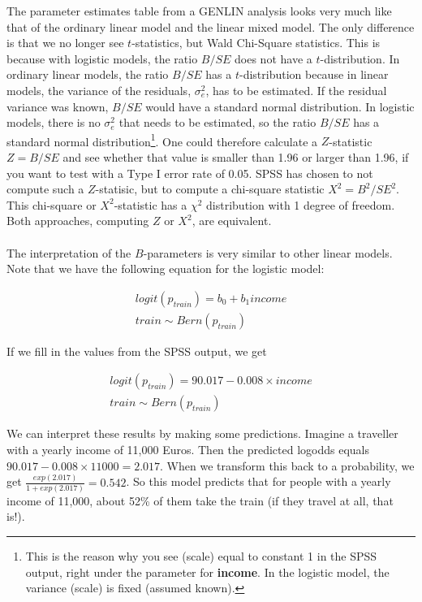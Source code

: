 \documentclass[]{report}\usepackage[]{graphicx}\usepackage[]{color}
\begin{document}
The parameter estimates table from a GENLIN analysis looks very much like that of the ordinary linear model and the linear mixed model. The only difference is that we no longer see $t$-statistics, but Wald Chi-Square statistics. This is because with logistic models, the ratio $B/SE$ does not have a $t$-distribution. In ordinary linear models, the ratio $B/SE$ has a $t$-distribution because in linear models, the variance of the residuals, $\sigma^2_e$, has to be estimated. If the residual variance was known, $B/SE$ would have a standard normal distribution. In logistic models, there is no $\sigma^2_e$ that needs to be estimated, so the ratio $B/SE$ has a standard normal distribution\footnote{This is the reason why you see (scale) equal to constant 1 in the SPSS output, right under the parameter for \textbf{income}. In the logistic model, the variance (scale) is fixed (assumed known).}. One could therefore calculate a $Z$-statistic $Z=B/SE$ and see whether that value is smaller than 1.96 or larger than 1.96, if you want to test with a Type I error rate of 0.05. SPSS has chosen to not compute such a $Z$-statisic, but to compute a chi-square statistic $X^2= B^2/SE^2$. This chi-square or $X^2$-statistic has a $\chi^2$ distribution with 1 degree of freedom. Both approaches, computing $Z$ or $X^2$, are equivalent.
\\
\\
The interpretation of the $B$-parameters is very similar to other linear models. Note that we have the following equation for the logistic model:



\begin{eqnarray}
logit(p_{train}) = b_0 + b_1 income \nonumber \\
train \sim Bern(p_{train})
\end{eqnarray}

If we fill in the values from the SPSS output, we get


\begin{eqnarray}
logit(p_{train}) = 90.017 - 0.008 \times income \nonumber \\
train \sim Bern(p_{train})
\end{eqnarray}


We can interpret these results by making some predictions. Imagine a traveller with a yearly income of 11,000 Euros. Then the predicted logodds equals $90.017 - 0.008 \times 11000= 2.017$. When we transform this back to a probability, we get $\frac{exp(2.017) } {1+ exp(2.017) }= 0.542  $. So this model predicts that for people with a yearly income of 11,000, about 52\% of them take the train (if they travel at all, that is!).
\end{document}
